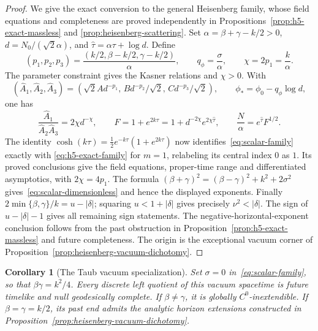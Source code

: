 \documentclass[10pt,a4paper]{article}
\numberwithin{equation}{section}
\newtheorem{corollary}[theorem]{Corollary}
\theoremstyle{definition}
\theoremstyle{remark}
\begin{document}
\begin{proof}
We give the exact conversion to the general Heisenberg family,
whose field equations and completeness are proved independently
in Propositions~\ref{prop:h5-exact-massless} and
\ref{prop:heisenberg-scattering}.
Set $\alpha=\beta+\gamma-k/2>0$, $d=N_0/(\sqrt2\alpha)$, and
$\widehat\tau=\alpha\tau+\log d$.  Define
\[
 (p_1,p_2,p_3)=\frac{(k/2,\beta-k/2,\gamma-k/2)}{\alpha},
 \qquad q_\phi=\frac\sigma\alpha,\qquad \chi=2p_1=\frac k\alpha.
\]
The parameter constraint gives the Kasner relations and
$\chi>0$.  With
\[
 (\widehat A_1,\widehat A_2,\widehat A_3)
 =(\sqrt2 A d^{-p_1},\,B d^{-p_2}/\sqrt2,
                                      \,C d^{-p_3}/\sqrt2),
 \qquad \phi_* =\phi_0-q_\phi\log d,
\]
one has
\[
 \frac{\widehat A_1}{\widehat A_2\widehat A_3}
   =2\chi d^{-\chi},\qquad
 F=1+e^{2k\tau}=1+d^{-2\chi}e^{2\chi\widehat\tau},
 \qquad \frac N\alpha=e^{\widehat\tau}F^{1/2}.
\]
The identity
$\cosh(k\tau)=\tfrac12e^{-k\tau}(1+e^{2k\tau})$
now identifies~\eqref{eq:scalar-family} exactly with
\eqref{eq:h5-exact-family} for $m=1$, relabeling its central
index $0$ as $1$.  Its proved conclusions give the field equations,
proper-time range and differentiated asymptotics, with
$2\chi=4p_1$.  The formula
$(\beta+\gamma)^2=(\beta-\gamma)^2+k^2+2\sigma^2$
gives~\eqref{eq:scalar-dimensionless} and hence the displayed
exponents.  Finally
$2\min\{\beta,\gamma\}/k=u-|\delta|$; squaring
$u<1+|\delta|$ gives precisely $\nu^2<|\delta|$.
The sign of $u-|\delta|-1$ gives all remaining sign statements.
The negative-horizontal-exponent conclusion follows from the
past obstruction in Proposition~\ref{prop:h5-exact-massless}
and future completeness.  The origin is the exceptional vacuum
corner of Proposition~\ref{prop:heisenberg-vacuum-dichotomy}.
\end{proof}

\begin{corollary}[The Taub vacuum specialization]
\label{cor:taub-vacuum-specialization}
Set $\sigma=0$ in~\eqref{eq:scalar-family}, so that
$\beta\gamma=k^2/4$.  Every discrete left quotient of this vacuum
spacetime is future timelike and null geodesically complete.
If $\beta\ne\gamma$, it is globally $C^0$-inextendible.
If $\beta=\gamma=k/2$, its past end admits the analytic horizon
extensions constructed in
Proposition~\ref{prop:heisenberg-vacuum-dichotomy}.
\end{corollary}
\end{document}
